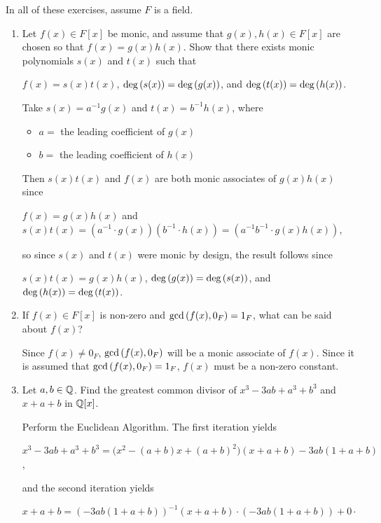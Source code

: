 \documentclass[11pt,fleqn,dvipsnames,usenames]{article}
\newcommand{\p}{\noindent}
\begin{document}
\p In all of these exercises, assume $F$ is a field.
\begin{enumerate}
\item \label{wlogmonic} Let $f(x)\in F[x]$ be monic, and assume that $g(x),h(x)\in F[x]$ are chosen so that $f(x) = g(x)h(x)$.  Show that there exists monic polynomials $s(x)$ and $t(x)$ such that
\begin{center}
$f(x) = s(x)t(x)$, $\text{deg}\left(s(x)\right) = \text{deg}\left(g(x)\right)$, and $\text{deg}\left(t(x)\right) = \text{deg}\left(h(x)\right)$.
\end{center}
\vsmsp

\solution Take $s(x) = a^{-1}g(x)$ and $t(x) = b^{-1}h(x)$, where
\begin{itemize}[\ ]
\item $a=$ the leading coefficient of $g(x)$
\item $b=$ the leading coefficient of $h(x)$  
\end{itemize}
Then $s(x)t(x)$ and $f(x)$ are both monic associates of $g(x)h(x)$ since
\begin{center}
$f(x) = g(x)h(x)$ and $s(x)t(x) = (a^{-1}\cdot g(x))(b^{-1}\cdot h(x)) = (a^{-1}b^{-1}\cdot g(x)h(x))$,
\end{center}
so since $s(x)$ and $t(x)$ were monic by design, the result follows since
\begin{center}
$s(x)t(x) = g(x)h(x)$, $\text{deg}\left(g(x)\right) = \text{deg}\left(s(x)\right)$, and $\text{deg}\left(h(x)\right) = \text{deg}\left(t(x)\right)$.
\end{center}

\item If $f(x)\in F[x]$ is non-zero and $\text{gcd}\left(f(x), 0_{F}\right) = 1_{F}$, what can be said about $f(x)$?
\vsmsp

\solution Since $f(x)\neq 0_{F}$, $\text{gcd}\left(f(x),0_{F}\right)$ will be a monic associate of $f(x)$.  Since it is assumed that
$\text{gcd}\left(f(x),0_{F}\right) = 1_{F}$, $f(x)$ must be a non-zero constant.

\item Let $a,b\in \mathbb{Q}$.  Find the greatest common divisor of $x^3 - 3ab + a^3 + b^3$ and $x + a + b$ in $\mathbb{Q}[x]$.
\vsmsp

\solution Perform the Euclidean Algorithm.  The first iteration yields
\begin{center}
$x^3 - 3ab + a^3 + b^3 = \big(x^2 - (a+b)x + (a+b)^2\big)(x + a + b) - 3ab(1 + a + b)$,
\end{center}
and the second iteration yields
\begin{center}
$x + a + b = (-3ab(1 + a + b))^{-1}(x + a + b)\cdot(-3ab(1 + a + b)) + 0\cdot$
\end{center}


\end{enumerate}
\end{document}
